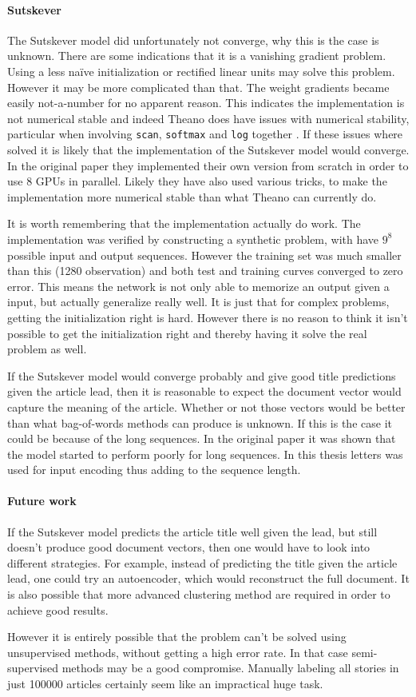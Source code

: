 \paragraph{Sutskever} The Sutskever model did unfortunately not converge, why this is the case is unknown. There are some indications that it is a vanishing gradient problem. Using a less naïve initialization or rectified linear units may solve this problem. However it may be more complicated than that. The weight gradients became easily not-a-number for no apparent reason. This indicates the implementation is not numerical stable and indeed Theano does have issues with numerical stability, particular when involving \texttt{scan}, \texttt{softmax} and \texttt{log} together \cite{theano-issue}. If these issues where solved it is likely that the implementation of the Sutskever model would converge. In the original paper \cite{sutskever} they implemented their own version from scratch in order to use 8 GPUs in parallel. Likely they have also used various tricks, to make the implementation more numerical stable than what Theano can currently do.

It is worth remembering that the implementation actually do work. The implementation was verified by constructing a synthetic problem, with have $9^8$ possible input and output sequences. However the training set was much smaller than this (1280 observation) and both test and training curves converged to zero error. This means the network is not only able to memorize an output given a input, but actually generalize really well. It is just that for complex problems, getting the initialization right is hard. However there is no reason to think it isn't possible to get the initialization right and thereby having it solve the real problem as well.

If the Sutskever model would converge probably and give good title predictions given the article lead, then it is reasonable to expect the document vector would capture the meaning of the article. Whether or not those vectors would be better than what bag-of-words methods can produce is unknown. If this is the case it could be because of the long sequences. In the original paper \cite{sutskever} it was shown that the model started to perform poorly for long sequences. In this thesis letters was used for input encoding thus adding to the sequence length.

\paragraph{Future work} If the Sutskever model predicts the article title well given the lead, but still doesn't produce good document vectors, then one would have to look into different strategies. For example, instead of predicting the title given the article lead, one could try an autoencoder, which would reconstruct the full document. It is also possible that more advanced clustering method are required in order to achieve good results.

However it is entirely possible that the problem can't be solved using unsupervised methods, without getting a high error rate. In that case semi-supervised methods may be a good compromise. Manually labeling all stories in just 100000 articles certainly seem like an impractical huge task.
 
